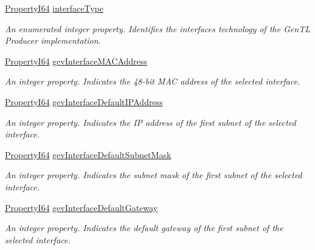 \begin{DoxyCompactItemize}
\hyperlink{group___common_interface_ga81749b2696755513663492664a18a893}{Property\+I64} \hyperlink{classmv_i_m_p_a_c_t_1_1acquire_1_1_gen_i_cam_1_1_system_module_ae81236e2c1b6a29de2c2863517929b45}{interface\+Type}
\begin{DoxyCompactList}\small\item\em An enumerated integer property. Identifies the interfaces technology of the Gen\+T\+L Producer implementation. \end{DoxyCompactList}\item 
\hyperlink{group___common_interface_ga81749b2696755513663492664a18a893}{Property\+I64} \hyperlink{classmv_i_m_p_a_c_t_1_1acquire_1_1_gen_i_cam_1_1_system_module_aef65b56a13878a70a9bad2309fb749c0}{gev\+Interface\+M\+A\+C\+Address}
\begin{DoxyCompactList}\small\item\em An integer property. Indicates the 48-\/bit M\+A\+C address of the selected interface. \end{DoxyCompactList}\item 
\hyperlink{group___common_interface_ga81749b2696755513663492664a18a893}{Property\+I64} \hyperlink{classmv_i_m_p_a_c_t_1_1acquire_1_1_gen_i_cam_1_1_system_module_ab02912952d8611f5b7c08714c18e7729}{gev\+Interface\+Default\+I\+P\+Address}
\begin{DoxyCompactList}\small\item\em An integer property. Indicates the I\+P address of the first subnet of the selected interface. \end{DoxyCompactList}\item 
\hyperlink{group___common_interface_ga81749b2696755513663492664a18a893}{Property\+I64} \hyperlink{classmv_i_m_p_a_c_t_1_1acquire_1_1_gen_i_cam_1_1_system_module_a8b4fb4d0b42cb5cc8239fd17f8d84da4}{gev\+Interface\+Default\+Subnet\+Mask}
\begin{DoxyCompactList}\small\item\em An integer property. Indicates the subnet mask of the first subnet of the selected interface. \end{DoxyCompactList}\item 
\hyperlink{group___common_interface_ga81749b2696755513663492664a18a893}{Property\+I64} \hyperlink{classmv_i_m_p_a_c_t_1_1acquire_1_1_gen_i_cam_1_1_system_module_a892fdf7b71a2bb07fc27b03b5752237e}{gev\+Interface\+Default\+Gateway}
\begin{DoxyCompactList}\small\item\em An integer property. Indicates the default gateway of the first subnet of the selected interface. \end{DoxyCompactList}\item 

\end{DoxyCompactItemize}
